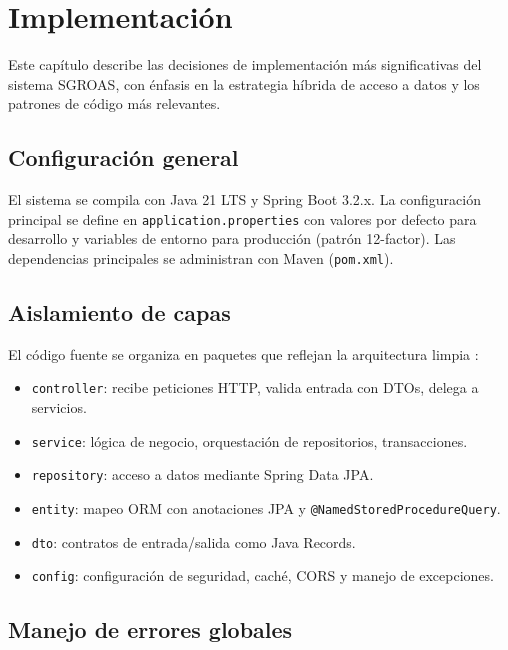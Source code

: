 \chapter{Implementación}
\label{cap:implementacion}

Este capítulo describe las decisiones de implementación más significativas del sistema SGROAS, con énfasis en la estrategia híbrida de acceso a datos y los patrones de código más relevantes.

\section{Configuración general}
\label{sec:configuracion}

El sistema se compila con Java 21 LTS y Spring Boot 3.2.x. La configuración principal se define en \texttt{application.properties} con valores por defecto para desarrollo y variables de entorno para producción (patrón 12-factor). Las dependencias principales se administran con Maven (\texttt{pom.xml}).

\section{Aislamiento de capas}
\label{sec:aislamiento}

El código fuente se organiza en paquetes que reflejan la arquitectura limpia \cite{martin2017}:

\begin{itemize}
  \item \texttt{controller}: recibe peticiones HTTP, valida entrada con DTOs, delega a servicios.
  \item \texttt{service}: lógica de negocio, orquestación de repositorios, transacciones.
  \item \texttt{repository}: acceso a datos mediante Spring Data JPA.
  \item \texttt{entity}: mapeo ORM con anotaciones JPA y \texttt{@NamedStoredProcedureQuery}.
  \item \texttt{dto}: contratos de entrada/salida como Java Records.
  \item \texttt{config}: configuración de seguridad, caché, CORS y manejo de excepciones.
\end{itemize}

\section{Manejo de errores globales}
\label{sec:errores}

